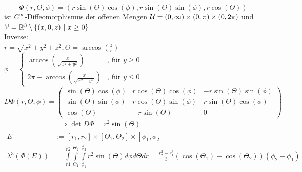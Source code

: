 \begin{example}
\begin{enumerate}
        $$\Phi(r, \Theta, \phi) = (r \sin(\Theta) \cos(\phi), r \sin(\Theta)\sin(\phi), r \cos(\Theta))$$ ist $C^{\infty}$-Diffeomorphismus der offenen Mengen $\mathcal{U} = (0,\infty) \times (0,\pi) \times (0,2\pi)$ und $\script{V} = \mathbb{R}^3 \setminus \{(x,0,z) \ | \ x \geq 0\}$\\
        Inverse:\\
        $r=\sqrt{x^2 + y^2 + z^2}, \Theta = \arccos(\frac{z}{r})$\\
        $\phi = \begin{cases}
          \arccos(\frac{x}{\sqrt{x^2 + y^2}}) & \text{, für } y \geq 0\\
          2\pi - \arccos(\frac{x}{\sqrt{x^2 + y^2}}) & \text{, für } y \leq 0
        \end{cases}$\\
        $D\Phi(r, \Theta, \phi) = \left(\begin{array}{ccc}
          \sin(\Theta)\cos(\phi) & r\cos(\Theta)\cos(\phi) & -r\sin(\Theta)\sin(\phi)\\
          \sin(\Theta)\sin(\phi) & r\cos(\Theta)\sin(\phi) & r\sin(\Theta)\cos(\phi)\\
          \cos(\Theta) & -r\sin(\Theta) & 0
        \end{array} \right)$
        \begin{align*}
          &\implies \det D\Phi = r^2 \sin(\Theta)\\
          E &:= [r_1, r_2] \times [\Theta_1, \Theta_2] \times [\phi_1, \phi_2]\\
          \lambda^3(\Phi(E)) &= \int\limits_{r1}^{r2}\int\limits_{\Theta_1}^{\Theta_2}\int\limits_{\phi_1}^{\phi_2} r^2 \sin(\Theta) d\phi d\Theta dr = \frac{r_2^3 - r_1^3}{3} (\cos(\Theta_1) - \cos(\Theta_2)) (\phi_2 - \phi_1)
        \end{align*}
    \end{enumerate}
  \end{example}

